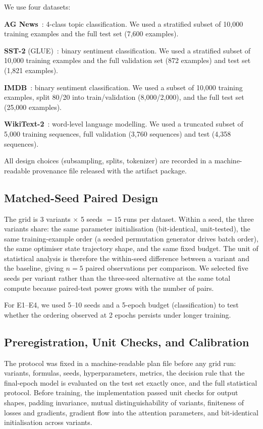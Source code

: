 \documentclass[10pt,a4paper]{article}
\begin{document}
We use four datasets:

\textbf{AG News}~\cite{zhang2015character}: 4-class topic classification. We used a stratified subset of 10,000 training examples and the full test set (7,600 examples).

\textbf{SST-2} (GLUE)~\cite{socher2013glue}: binary sentiment classification. We used a stratified subset of 10,000 training examples and the full validation set (872 examples) and test set (1,821 examples).

\textbf{IMDB}~\cite{maas2011learning}: binary sentiment classification. We used a subset of 10,000 training examples, split 80/20 into train/validation (8,000/2,000), and the full test set (25,000 examples).

\textbf{WikiText-2}~\cite{merity2016wikitext}: word-level language modelling. We used a truncated subset of 5,000 training sequences, full validation (3,760 sequences) and test (4,358 sequences).

All design choices (subsampling, splits, tokenizer) are recorded in a machine-readable provenance file released with the artifact package.

\subsection{Matched-Seed Paired Design}

The grid is 3 variants $\times$ 5 seeds $= 15$ runs per dataset. Within a seed, the three variants share: the same parameter initialisation (bit-identical, unit-tested), the same training-example order (a seeded permutation generator drives batch order), the same optimiser state trajectory shape, and the same fixed budget. The unit of statistical analysis is therefore the within-seed difference between a variant and the baseline, giving $n = 5$ paired observations per comparison. We selected five seeds per variant rather than the three-seed alternative at the same total compute because paired-test power grows with the number of pairs.

For E1--E4, we used 5--10 seeds and a 5-epoch budget (classification) to test whether the ordering observed at 2 epochs persists under longer training.

\subsection{Preregistration, Unit Checks, and Calibration}

The protocol was fixed in a machine-readable plan file before any grid run: variants, formulas, seeds, hyperparameters, metrics, the decision rule that the final-epoch model is evaluated on the test set exactly once, and the full statistical protocol. Before training, the implementation passed unit checks for output shapes, padding invariance, mutual distinguishability of variants, finiteness of losses and gradients, gradient flow into the attention parameters, and bit-identical initialisation across variants.
\end{document}
